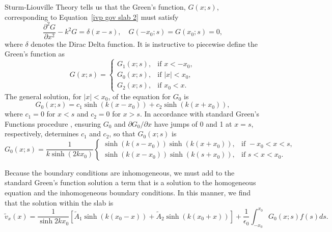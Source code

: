 \documentclass{aastex61}
\begin{document}
Sturm-Liouville Theory tells us that the Green's function, $G(x;s)$, corresponding to Equation~\eqref{ivp gov slab 2} must satisfy 
\begin{equation}
\frac{\partial^2G}{\partial x^2} - k^2 G = \delta(x-s), \quad G(-x_0;s) = G(x_0;s) = 0,
\end{equation}
where $\delta$ denotes the Dirac Delta function. It is instructive to piecewise define the Green's function as
\begin{equation}
G(x;s) = 
\begin{cases}
G_1(x;s), & \text{if } x < -x_0, \\
G_0(x;s), & \text{if } |x| < x_0, \\
G_2(x;s), & \text{if } x_0 < x.
\end{cases}
\end{equation}
The general solution, for $|x| < x_0$, of the equation for $G_0$ is
\begin{equation}
G_0(x;s) = c_1\sinh(k(x - x_0)) + c_2\sinh(k(x + x_0)),
\end{equation}
where $c_1 = 0$ for $x < s$ and $c_2 = 0$ for $x > s$. In accordance with standard Green's Functions procedure \citep{boy_etal12}, ensuring $G_0$ and $\partial G_0 / \partial x$ have jumps of 0 and 1 at $x = s$, respectively,  determines $c_1$ and $c_2$, so that $G_0(x;s)$ is
\begin{equation}
G_0(x;s) = \frac{1}{k\sinh(2k x_0)}
\begin{cases}
\sinh(k(s - x_0))\sinh(k(x + x_0)), & \text{if } -x_0<x<s, \\
\sinh(k(x - x_0))\sinh(k(s + x_0)), & \text{if } s<x<x_0.
\end{cases}
\end{equation}

Because the boundary conditions are inhomogeneous, we must add to the standard Green's function solution a term that is a solution to the homogeneous equation and the inhomogeneous boundary conditions. In this manner, we find that the solution within the slab is
\begin{equation}
\tilde{v}_x(x) = \frac{1}{\sinh{2kx_0}} \left[ \tilde{A}_1\sinh(k(x_0 - x)) + \tilde{A}_2\sinh(k(x_0 + x)) \right] + \frac{1}{\epsilon_0}\int_{-x_0}^{x_0} G_0(x;s) f(s) ds.
\end{equation}
\end{document}
